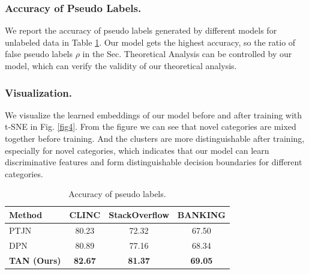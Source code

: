 \documentclass[letterpaper]{article} %
\begin{document}
\subsubsection{Accuracy of Pseudo Labels. } We report the accuracy of pseudo labels generated by different models for unlabeled data in Table \ref{table5}. Our model gets the highest accuracy, so the ratio of false pseudo labels $\rho$ in the Sec. Theoretical Analysis can be controlled by our model, which can verify the validity of our theoretical analysis.

\subsubsection{Visualization. } We visualize the learned embeddings of our model before and after training with t-SNE in Fig. \ref{fig4}. From the figure we can see that novel categories are mixed together before training. And the clusters are more distinguishable after training, especially for novel categories, which indicates that our model can learn discriminative features and form distinguishable decision boundaries for different categories.




\begin{table}
\centering
\begin{tabular}{lccc}
\toprule
Method & CLINC  & StackOverflow & BANKING \\
\midrule
PTJN &80.23 &72.32  &67.50   \\
DPN  &80.89 &77.16  &68.34   \\
\textbf{TAN (Ours)} & \textbf{82.67} & \textbf{81.37} & \textbf{69.05}   \\
\bottomrule
\end{tabular}
\caption{Accuracy of pseudo labels.}
\label{table5}
\end{table}
\end{document}
